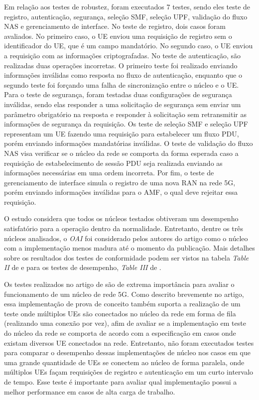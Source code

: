 Em relação aos testes de robustez, foram executados 7 testes, sendo eles teste de registro, autenticação, segurança, seleção SMF, seleção UPF, validação do fluxo NAS e gerenciamento de interface.
No teste de registro, dois casos foram avaliados. No primeiro caso, o UE enviou uma requisição de registro sem o identificador do UE, que é um campo mandatório. No segundo caso, o UE enviou a requisição com as informações criptografadas.
No teste de autenticação, são realizadas duas operações incorretas. O primeiro teste foi realizado enviando informações inválidas como resposta no fluxo de autenticação, enquanto que o segundo teste foi forçando uma falha de sincronização entre o núcleo e o UE.
Para o teste de segurança, foram testadas duas configurações de segurança inválidas, sendo elas responder a uma solicitação de segurança sem enviar um parâmetro obrigatório na resposta e responder à solicitação sem retransmitir as informações de segurança da requisição.
Os teste de seleção SMF e seleção UPF representam um UE fazendo uma requisição para estabelecer um fluxo PDU, porém enviando informações mandatórias inválidas.
O teste de validação do fluxo NAS visa verificar se o núcleo da rede se comporta da forma esperada caso a requisição de estabelecimento de sessão PDU seja realizada enviando as informações necessárias em uma ordem incorreta.
Por fim, o teste de gerenciamento de interface simula o registro de uma nova RAN na rede 5G, porém enviando informações inválidas para o AMF, o qual deve rejeitar essa requisição. 

O estudo considera que todos os núcleos testados obtiveram um desempenho satisfatório para a operação dentro da normalidade. Entretanto, dentre os três núcleos analisados, o \textit{OAI} foi considerado pelos autores do artigo como o núcleo com a implementação menos madura até o momento da publicação.
Mais detalhes sobre os resultados dos testes de conformidade podem ser vistos na tabela \textit{Table II} de  e para os testes de desempenho, \textit{Table III} de .

Os testes realizados no artigo de  são de extrema importância para avaliar o funcionamento de um núcleo de rede 5G.
Como descrito brevemente no artigo, essa implementação de prova de conceito também suporta a realização de um teste onde múltiplos UEs são conectados no núcleo da rede em forma de fila (realizando uma conexão por vez), afim de avaliar se a implementação em teste do núcleo da rede se comporta de acordo com a especificação em casos onde existam diversos UE conectados na rede.
Entretanto, não foram executados testes para comparar o desempenho dessas implementações de núcleo nos casos em que uma grande quantidade de UEs se conectem ao núcleo de forma paralela, onde múltiplos UEs façam requisições de registro e autenticação em um curto intervalo de tempo.
Esse teste é importante para avaliar qual implementação possui a melhor performance em casos de alta carga de trabalho.

